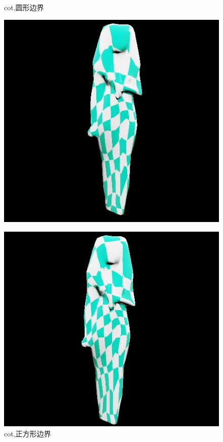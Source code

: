 \documentclass{article}
\begin{document}
	\begin{figure}[htbp]
		\centering
		\begin{minipage}{0.24\linewidth}
			\centering
			\caption{cot,圆形边界}
			\includegraphics[width=1\linewidth]{lsis_circle_tex.JPG}
			\label{chutian1}%
		\end{minipage}
		\begin{minipage}{0.24\linewidth}
			\centering
			\caption{cot,正方形边界}
			\includegraphics[width=1\linewidth]{lsis_square_tex.JPG}

\end{minipage}
\end{figure}
\end{document}
